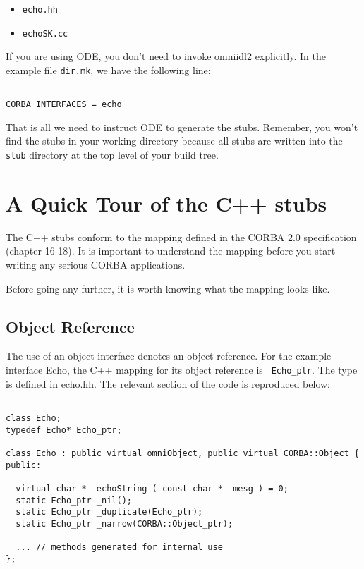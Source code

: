 \documentclass[11pt,twoside,onecolumn]{book}
\begin{document}
\begin{itemize}
\item {\tt echo.hh}
\item {\tt echoSK.cc}
\end{itemize}

If you are using ODE, you don't need to invoke omniidl2 explicitly. In
the example file {\tt dir.mk}, we have the following line:

{\small
\begin{verbatim}

CORBA_INTERFACES = echo

\end{verbatim}
}

That is all we need to instruct ODE to generate the stubs. Remember, you
won't find the stubs in your working directory because all stubs are written
into the {\tt stub} directory at the top level of your build tree. 

\section{A Quick Tour of the C++ stubs}

The C++ stubs conform to the mapping defined in the CORBA 2.0 specification
(chapter 16-18). It is important to understand the mapping before you start
writing any serious CORBA applications.

Before going any further, it is worth knowing what the mapping looks like.

\subsection{Object Reference}

The use of an object interface denotes an object reference. For the
example interface Echo, the C++ mapping for its object reference is {\tt
Echo\_ptr}. The type is defined in echo.hh. The relevant section of the
code is reproduced below:

{\small
\begin{verbatim}

class Echo;
typedef Echo* Echo_ptr;

class Echo : public virtual omniObject, public virtual CORBA::Object {
public:

  virtual char *  echoString ( const char *  mesg ) = 0;
  static Echo_ptr _nil();
  static Echo_ptr _duplicate(Echo_ptr);
  static Echo_ptr _narrow(CORBA::Object_ptr);

  ... // methods generated for internal use
};

\end{verbatim}
}
\end{document}
